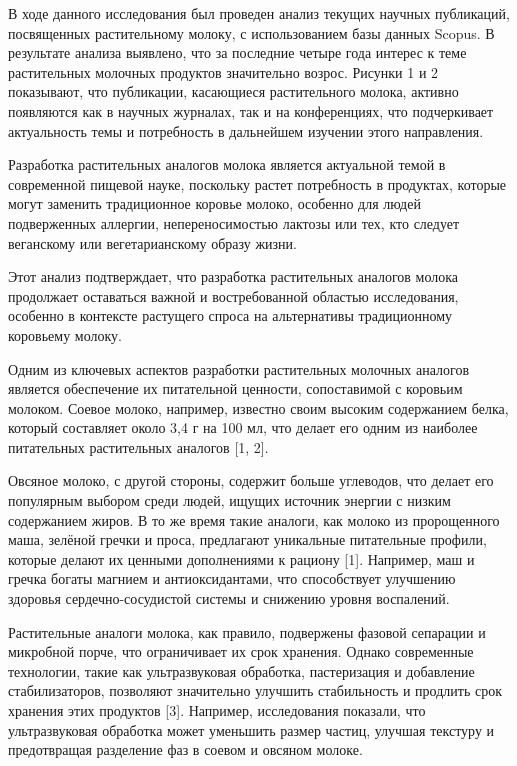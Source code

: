 \begin{multicols}{2}
В ходе данного исследования был проведен анализ текущих научных
публикаций, посвященных растительному молоку, с использованием базы
данных Scopus. В результате анализа выявлено, что за последние четыре
года интерес к теме растительных молочных продуктов значительно возрос.
Рисунки 1 и 2 показывают, что публикации, касающиеся растительного
молока, активно появляются как в научных журналах, так и на
конференциях, что подчеркивает актуальность темы и потребность в
дальнейшем изучении этого направления.

Разработка растительных аналогов молока является актуальной темой в
современной пищевой науке, поскольку растет потребность в продуктах,
которые могут заменить традиционное коровье молоко, особенно для людей
подверженных аллергии, непереносимостью лактозы или тех, кто следует
веганскому или вегетарианскому образу жизни.

Этот анализ подтверждает, что разработка растительных аналогов молока
продолжает оставаться важной и востребованной областью исследования,
особенно в контексте растущего спроса на альтернативы традиционному
коровьему молоку.

Одним из ключевых аспектов разработки растительных молочных аналогов
является обеспечение их питательной ценности, сопоставимой с коровьим
молоком. Соевое молоко, например, известно своим высоким содержанием
белка, который составляет около 3,4 г на 100 мл, что делает его одним из
наиболее питательных растительных аналогов {[}1, 2{]}.

Овсяное молоко, с другой стороны, содержит больше углеводов, что делает
его популярным выбором среди людей, ищущих источник энергии с низким
содержанием жиров. В то же время такие аналоги, как молоко из
пророщенного маша, зелёной гречки и проса, предлагают уникальные
питательные профили, которые делают их ценными дополнениями к рациону
{[}1{]}. Например, маш и гречка богаты магнием и антиоксидантами, что
способствует улучшению здоровья сердечно-сосудистой системы и снижению
уровня воспалений.

Растительные аналоги молока, как правило, подвержены фазовой сепарации и
микробной порче, что ограничивает их срок хранения. Однако современные
технологии, такие как ультразвуковая обработка, пастеризация и
добавление стабилизаторов, позволяют значительно улучшить стабильность и
продлить срок хранения этих продуктов {[}3{]}. Например, исследования
показали, что ультразвуковая обработка может уменьшить размер частиц,
улучшая текстуру и предотвращая разделение фаз в соевом и овсяном
молоке.


\end{multicols}
